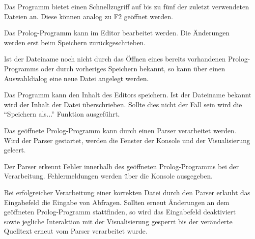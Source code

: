 \documentclass[parskip=full,11pt,twoside]{scrartcl}
\begin{document}

Das Programm bietet einen Schnellzugriff auf bis zu fünf der zuletzt verwendeten Dateien an. Diese können analog zu F2 geöffnet werden.


Das Prolog-Programm kann im Editor bearbeitet werden. Die Änderungen werden erst beim Speichern zurückgeschrieben.


Ist der Dateiname noch nicht durch das Öffnen eines bereits vorhandenen Prolog-Programms oder durch vorheriges Speichern bekannt, so kann über einen Auswahldialog eine neue Datei angelegt werden.


Das Programm kann den Inhalt des Editors speichern. Ist der Dateiname bekannt wird der Inhalt der Datei überschrieben. Sollte dies nicht der Fall sein wird die \enquote{Speichern als...} Funktion ausgeführt.


Das geöffnete Prolog-Programm kann durch einen Parser verarbeitet werden. Wird der Parser gestartet, werden die Fenster der Konsole und der Visualisierung geleert.


Der Parser erkennt Fehler innerhalb des geöffneten Prolog-Programms bei der Verarbeitung. Fehlermeldungen werden über die Konsole ausgegeben.


Bei erfolgreicher Verarbeitung einer korrekten Datei durch den Parser erlaubt das Eingabefeld die Eingabe von Abfragen. Sollten erneut Änderungen an dem geöffneten Prolog-Programm stattfinden, so wird das Eingabefeld deaktiviert sowie jegliche Interaktion mit der Visualisierung gesperrt bis der veränderte Quelltext erneut vom Parser verarbeitet wurde.

\end{document}
